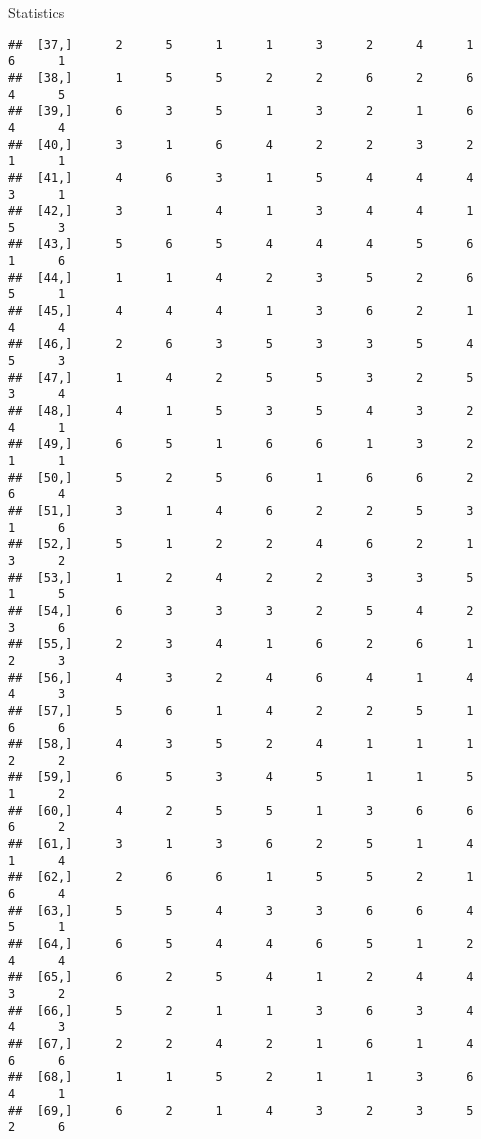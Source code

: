\documentclass[
  ignorenonframetext,
]{beamer}
\begin{document}
\begin{frame}[fragile]{Statistics}
\begin{verbatim}
##  [37,]      2      5      1      1      3      2      4      1      6      1
##  [38,]      1      5      5      2      2      6      2      6      4      5
##  [39,]      6      3      5      1      3      2      1      6      4      4
##  [40,]      3      1      6      4      2      2      3      2      1      1
##  [41,]      4      6      3      1      5      4      4      4      3      1
##  [42,]      3      1      4      1      3      4      4      1      5      3
##  [43,]      5      6      5      4      4      4      5      6      1      6
##  [44,]      1      1      4      2      3      5      2      6      5      1
##  [45,]      4      4      4      1      3      6      2      1      4      4
##  [46,]      2      6      3      5      3      3      5      4      5      3
##  [47,]      1      4      2      5      5      3      2      5      3      4
##  [48,]      4      1      5      3      5      4      3      2      4      1
##  [49,]      6      5      1      6      6      1      3      2      1      1
##  [50,]      5      2      5      6      1      6      6      2      6      4
##  [51,]      3      1      4      6      2      2      5      3      1      6
##  [52,]      5      1      2      2      4      6      2      1      3      2
##  [53,]      1      2      4      2      2      3      3      5      1      5
##  [54,]      6      3      3      3      2      5      4      2      3      6
##  [55,]      2      3      4      1      6      2      6      1      2      3
##  [56,]      4      3      2      4      6      4      1      4      4      3
##  [57,]      5      6      1      4      2      2      5      1      6      6
##  [58,]      4      3      5      2      4      1      1      1      2      2
##  [59,]      6      5      3      4      5      1      1      5      1      2
##  [60,]      4      2      5      5      1      3      6      6      6      2
##  [61,]      3      1      3      6      2      5      1      4      1      4
##  [62,]      2      6      6      1      5      5      2      1      6      4
##  [63,]      5      5      4      3      3      6      6      4      5      1
##  [64,]      6      5      4      4      6      5      1      2      4      4
##  [65,]      6      2      5      4      1      2      4      4      3      2
##  [66,]      5      2      1      1      3      6      3      4      4      3
##  [67,]      2      2      4      2      1      6      1      4      6      6
##  [68,]      1      1      5      2      1      1      3      6      4      1
##  [69,]      6      2      1      4      3      2      3      5      2      6

\end{verbatim}
\end{frame}
\end{document}
